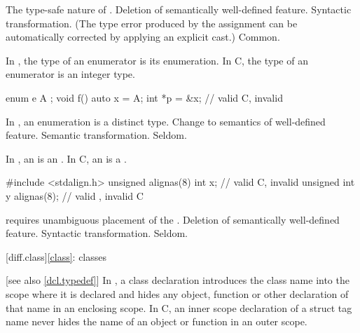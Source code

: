 \rationale
The type-safe nature of \Cpp{}.
\effect
Deletion of semantically well-defined feature.
\difficulty
Syntactic transformation.
(The type error produced by the assignment can be automatically
corrected by applying an explicit cast.)
\howwide
Common.

\change
In \Cpp{}, the type of an enumerator is its enumeration. In C, the type of an enumerator is an integer type.

\begin{example}
\begin{codeblock}
enum e { A };
void f() {
  auto x = A;
  int *p = &x;                  // valid C, invalid \Cpp{}
}
\end{codeblock}
\end{example}

\rationale
In \Cpp{}, an enumeration is a distinct type.
\effect
Change to semantics of well-defined feature.
\difficulty
Semantic transformation.
\howwide
Seldom.

\change
In \Cpp{},
an  is an .
In C, an  is a .

\begin{example}
\begin{codeblock}
#include <stdalign.h>
unsigned alignas(8) int x;      // valid C, invalid \Cpp{}
unsigned int y alignas(8);      // valid \Cpp{}, invalid C
\end{codeblock}
\end{example}

\rationale
\Cpp{} requires unambiguous placement of the .
\effect
Deletion of semantically well-defined feature.
\difficulty
Syntactic transformation.
\howwide
Seldom.

[diff.class]{\ref*{class}: classes}

 [see also \ref{dcl.typedef}]
\change
In \Cpp{}, a class declaration introduces the class name into the scope where it is
declared and hides any object, function or other declaration of that name in an enclosing
scope. In C, an inner scope declaration of a struct tag name never hides the name of an
object or function in an outer scope.

